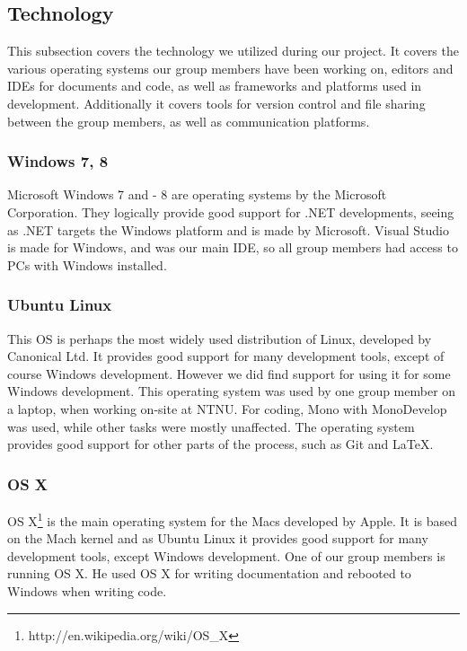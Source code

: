 \subsection{Technology}%

This subsection covers the technology we utilized during our project. It covers the various operating systems our group members have been working on, editors and IDEs for documents and code, as well as frameworks and platforms used in development. Additionally it covers tools for version control and file sharing between the group members, as well as communication platforms.

\subsubsection{Windows 7, 8}
Microsoft Windows 7 and - 8 are operating systems by the Microsoft Corporation. They logically provide good support for .NET developments, seeing as .NET targets the Windows platform and is made by Microsoft. Visual Studio is made for Windows, and was our main IDE, so all group members had access to PCs with Windows installed.

\subsubsection{Ubuntu Linux}
This OS is perhaps the most widely used distribution of Linux, developed by Canonical Ltd. It provides good support for many development tools, except of course Windows development. However we did find support for using it for some Windows development.
This operating system was used by one group member on a laptop, when working on-site at NTNU. For coding, Mono with MonoDevelop was used, while other tasks were mostly unaffected. The operating system provides good support for other parts of the process, such as Git and \LaTeX.

\subsubsection{OS X}
OS X\footnote{http://en.wikipedia.org/wiki/OS\_X}
 is the main operating system for the Macs developed by Apple. It is based on the Mach kernel and as Ubuntu Linux it provides good support for many development tools, except Windows development. One of our group members is running OS X. He used OS X for writing documentation and rebooted to Windows when writing code. 

